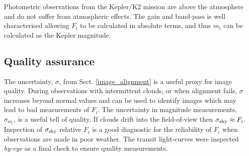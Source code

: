Photometric observations from the Kepler/K2 mission are above the atmosphere and do not suffer from atmospheric effects. The gain and band-pass is well characterised allowing $F_i$ to be calculated in absolute terms, and thus $m_i$ can be calculated as the Kepler magnitude. 

\subsection{Quality assurance}

The uncertainty, $\sigma$, from Sect. \ref{image_alignment} is a useful proxy for image quality. During observations with intermittent clouds, or when alignment fails, $\sigma$ increases beyond normal values and can be used to identify images which may lead to bad measurements of $F_i$. The uncertainty in magnitude measurements, $\sigma_{m_i}$, is a useful tell of quality. If clouds drift into the field-of-view then $\sigma_{\rm sky} \approx F_i$. Inspection of $\sigma_{\rm sky}$ relative $F_i$ is a good diagnostic for the reliability of $F_i$ when observations are made in poor weather. The transit light-curves were inspected \textit{by-eye} as a final check to ensure quality measurements.
\fi
